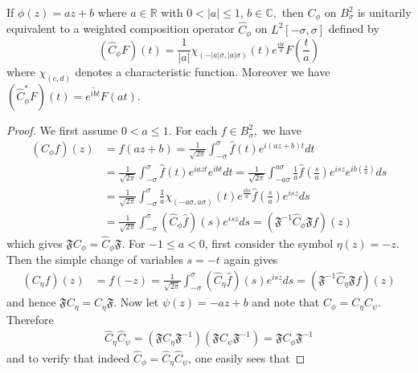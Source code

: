\documentclass[10pt,a4paper]{amsart}
\begin{document}
\begin{prop}\label{adjoint formula} If $\phi(z)=az+b$ where $a\in \mathbb{R}$ with $0<|a|\leq 1$, $b\in \mathbb{C},$ then $C_{\phi}$ on $ B^2_{\sigma}$ is unitarily equivalent to a weighted composition operator $\widehat{C}_{\phi}$ on $L^2[-\sigma,\sigma]$ defined by 
\[(\widehat{C}_{\phi}F)(t)=\frac{1}{|a|}\chi_{(-|a|\sigma, |a|\sigma)}(t)e^{\frac{\mathrm{i}bt}{a}}F\left(\frac{t}{a}\right)\] 
where $\chi_{(c,d)}$ denotes a characteristic function. Moreover we have $(\widehat{C}_{\phi}^*F)(t)=\overline{e^{ibt}}F(at).$
\end{prop}

\begin{proof} We first assume $0<a\leq 1.$ For each $f\in B^2_{\sigma},$ we have
\begin{align}
(C_{\phi}f)(z)&=f(az+b)=\frac{1}{\sqrt{2\pi}}\int^\sigma_{-\sigma}\widehat{f}(t)e ^{i(az+b)t}dt\nonumber\\
&=\frac{1}{\sqrt{2\pi}}\int^\sigma_{-\sigma}\widehat{f}(t)e ^{iazt}e^{ibt}dt=\frac{1}{\sqrt{2\pi}}\int^{a\sigma}_{-a\sigma}\frac{1}{a}\widehat{f}\left(\frac{s}{a}\right)e ^{isz}e^{ib\left(\frac{s}{a}\right)}ds\nonumber\\
&=\frac{1}{\sqrt{2\pi}}\int^{\sigma}_{-\sigma}\frac{1}{a}\chi_{(-a\sigma, a\sigma)}(t)e^{\frac{ibs}{a}}\widehat{f}\left(\frac{s}{a}\right)e ^{isz}ds\nonumber\\
&=\frac{1}{\sqrt{2\pi}}\int^{\sigma}_{-\sigma}(\widehat{C}_{\phi}\widehat{f})(s)e ^{isz}ds=(\mathfrak{F}^{-1}\widehat{C}_\phi\mathfrak{F}f)(z)\nonumber
\end{align}
which gives $\mathfrak{F}C_{\phi}= \widehat{C}_{\phi}\mathfrak{F}$. For $-1\leq a <0$, first consider the symbol $\eta(z)=-z$. Then the simple change of variables $s=-t$ again gives
\begin{align}\label{eqc3}
(C_{\eta}f)(z)&=f(-z)=\frac{1}{\sqrt{2\pi}}\int^{\sigma}_{-\sigma}(\widehat{C}_{\eta}\widehat{f})(s)e ^{isz}ds=(\mathfrak{F}^{-1}\widehat{C}_\eta\mathfrak{F}f)(z)
\end{align}
and hence $\mathfrak{F}C_{\eta}= \widehat{C}_{\eta}\mathfrak{F}.$  Now let $\psi(z)=-az+b$ and note that $C_{\phi}=C_{\eta}C_{\psi}.$ Therefore 
\begin{align*}
\widehat{C}_{\eta}\widehat{C}_{\psi}=(\mathfrak{F}C_{\eta}\mathfrak{F}^{-1})(\mathfrak{F}C_{\psi}\mathfrak{F}^{-1})=\mathfrak{F}C_{\phi}\mathfrak{F}^{-1}
\end{align*}
and to verify that indeed $\widehat{C}_\phi=\widehat{C}_{\eta}\widehat{C}_{\psi}$, one easily sees that

\end{proof}
\end{document}
